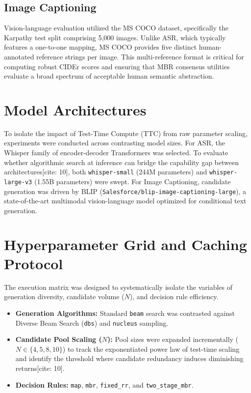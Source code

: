 \subsection{Image Captioning}
Vision-language evaluation utilized the MS COCO dataset, specifically the Karpathy test split comprising 5,000 images. Unlike ASR, which typically features a one-to-one mapping, MS COCO provides five distinct human-annotated reference strings per image. This multi-reference format is critical for computing robust CIDEr scores and ensuring that MBR consensus utilities evaluate a broad spectrum of acceptable human semantic abstraction.

\section{Model Architectures}
\label{sec:models}

To isolate the impact of Test-Time Compute (TTC) from raw parameter scaling, experiments were conducted across contrasting model sizes.
For ASR, the Whisper family of encoder-decoder Transformers was selected. To evaluate whether algorithmic search at inference can bridge the capability gap between architectures[cite: 10], both \texttt{whisper-small} (244M parameters) and \texttt{whisper-large-v3} (1.55B parameters) were swept.
For Image Captioning, candidate generation was driven by BLIP (\texttt{Salesforce/blip-image-captioning-large}), a state-of-the-art multimodal vision-language model optimized for conditional text generation.

\section{Hyperparameter Grid and Caching Protocol}
\label{sec:hyperparameter_grid}

The execution matrix was designed to systematically isolate the variables of generation diversity, candidate volume ($N$), and decision rule efficiency.
\begin{itemize}
    \item \textbf{Generation Algorithms:} Standard \texttt{beam} search was contrasted against Diverse Beam Search (\texttt{dbs}) and \texttt{nucleus} sampling.
    \item \textbf{Candidate Pool Scaling ($N$):} Pool sizes were expanded incrementally ($N \in \{4, 5, 8, 10\}$) to track the exponentiated power law of test-time scaling and identify the threshold where candidate redundancy induces diminishing returns[cite: 10].
    \item \textbf{Decision Rules:} \texttt{map}, \texttt{mbr}, \texttt{fixed\_rr}, and \texttt{two\_stage\_mbr}.
\end{itemize}

